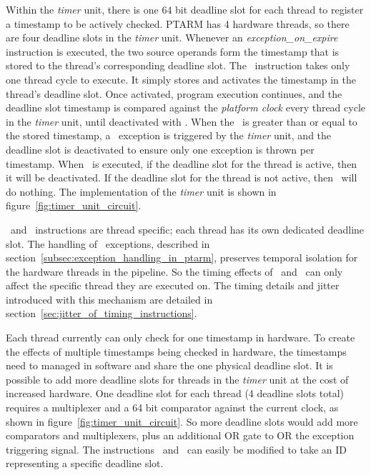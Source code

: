 Within the \emph{timer} unit, there is one 64 bit deadline slot for each thread to register a timestamp to be actively checked. 
PTARM has 4 hardware threads, so there are four deadline slots in the \emph{timer} unit. 
Whenever an \emph{exception\_on\_expire} instruction is executed, the two source operands form the timestamp that is stored to the thread's corresponding deadline slot.
The \exceptiononexpire\ instruction takes only one thread cycle to execute.
It simply stores and activates the timestamp in the thread's deadline slot.
Once activated, program execution continues, and the deadline slot timestamp is compared against the \emph{platform clock} every thread cycle in the \emph{timer} unit, until deactivated with \deactivateexception.
When the \platformclock\ is greater than or equal to the stored timestamp, a \timerexpired\ exception is triggered by the \emph{timer} unit, and the deadline slot is deactivated to ensure only one exception is thrown per timestamp.
When \deactivateexception\ is executed, if the deadline slot for the thread is active, then it will be deactivated. 
If the deadline slot for the thread is not active, then \deactivateexception\ will do nothing.
The implementation of the \emph{timer} unit is shown in figure~\ref{fig:timer_unit_circuit}.   

\Exceptiononexpire\ and \deactivateexception\ instructions are thread specific; each thread has its own dedicated deadline slot.
The handling of \timerexpired\ exceptions, described in section~\ref{subsec:exception_handling_in_ptarm}, preserves temporal isolation for the hardware threads in the pipeline.
So the timing effects of \exceptiononexpire\ and \deactivateexception\ can only affect the specific thread they are executed on.
The timing details and jitter introduced with this mechanism are detailed in section~\ref{sec:jitter_of_timing_instructions}.

Each thread currently can only check for one timestamp in hardware. 
To create the effects of multiple timestamps being checked in hardware, the timestamps need to managed in software and share the one physical deadline slot.
It is possible to add more deadline slots for threads in the \emph{timer} unit at the cost of increased hardware.
One deadline slot for each thread (4 deadline slots total) requires a multiplexer and a 64 bit comparator against the current clock, as shown in figure~\ref{fig:timer_unit_circuit}.
So more deadline slots would add more comparators and multiplexers, plus an additional OR gate to OR the exception triggering signal. 
The instructions \exceptiononexpire\ and \deactivateexception\ can easily be modified to take an ID representing a specific deadline slot.


